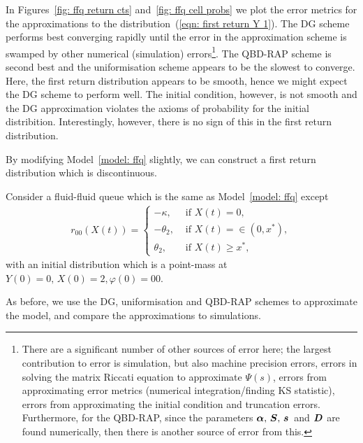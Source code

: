 In Figures~\ref{fig: ffq return cts} and~\ref{fig: ffq cell probs} we plot the error metrics for the approximations to the distribution~(\ref{eqn: first return Y 1}). The DG scheme performs best converging rapidly until the error in the approximation scheme is swamped by other numerical (simulation) errors\footnote{There are a significant number of other sources of error here; the largest contribution to error is simulation, but also machine precision errors, errors in solving the matrix Riccati equation to approximate \(\mathbb \Psi(s)\), errors from approximating error metrics (numerical integration/finding KS statistic), errors from approximating the initial condition and truncation errors. Furthermore, for the QBD-RAP, since the parameters \(\boldsymbol \alpha,\,\boldsymbol S,\,\boldsymbol s\,\) and \(\boldsymbol D\) are found numerically, then there is another source of error from this.}. The QBD-RAP scheme is second best and the uniformisation scheme appears to be the slowest to converge. Here, the first return distribution appears to be smooth, hence we might expect the DG scheme to perform well. The initial condition, however, is not smooth and the DG approximation violates the axioms of probability for the initial distribition. Interestingly, however, there is no sign of this in the first return distribution. 
 

By modifying Model~\ref{model: ffq} slightly, we can construct a first return distribution which is discontinuous. 
\begin{model}\label{model: ffq2}
	Consider a fluid-fluid queue which is the same as Model~\ref{model: ffq} except 
	\begin{align}
		r_{00}(X(t)) = \begin{cases}
			-\kappa, & \mbox{ if }X(t)=0,\\
			-\theta_2, & \mbox{ if }X(t)=\in(0,x^*),\\
			\theta_2, & \mbox{ if }X(t)\geq x^*,
		\end{cases}
	\end{align}
	with an initial distribution which is a point-mass at \(Y(0)=0,\, X(0)=2, \varphi(0)=00\). 
\end{model}
As before, we use the DG, uniformisation and QBD-RAP schemes to approximate the model, and compare the approximations to simulations. 

